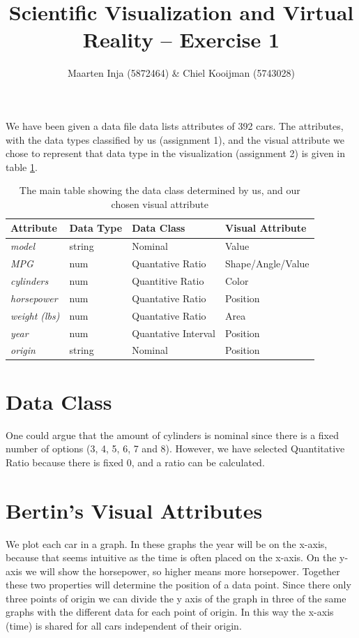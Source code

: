 \documentclass{article}[10pt]
\title{Scientific Visualization and Virtual Reality – Exercise 1}
\author{Maarten Inja (5872464) \& Chiel Kooijman (5743028)}
\begin{document}
\maketitle

We have been given a data file data lists attributes of 392 cars. The
attributes, with the data types classified by us (assignment 1), and the visual
attribute we chose to represent that data type in the visualization (assignment
2) is given in table \ref{tab:mainTable}.

\begin{table}
    \begin{tabular}{l l | l l}
    \textbf{Attribute} & \textbf{Data Type} & \textbf{Data Class} & \textbf{Visual Attribute}\\
    \hline
    \textit{model} & string & Nominal       &  Value \\
    \textit{MPG} & num & Quantative Ratio   & Shape/Angle/Value \\
    \textit{cylinders} & num & Quantitive Ratio & Color \\
    \textit{horsepower} & num & Quantative Ratio & Position\\
    \textit{weight (lbs)} & num & Quantative Ratio & Area \\
    \textit{year} & num & Quantative Interval & Position \\
    \textit{origin} & string & Nominal & Position
    \end{tabular}
\caption{The main table showing the data class determined by us, and our chosen
visual attribute}
\label{tab:mainTable}
\end{table}

\section{Data Class}
One could argue that the amount of cylinders is
nominal since there is a fixed number of options (3, 4, 5, 6, 7 and 8). However,
we have selected Quantitative Ratio because there is fixed 0, and a ratio can be
calculated.

\section{Bertin's Visual Attributes}

We plot each car in a graph.
In these graphs the year will be on the x-axis, because that seems intuitive as the time
is often placed on the x-axis. On the y-axis we will show the horsepower, so
higher means more horsepower.
Together these two properties will determine the position of a data point.
Since there only three points of origin we can divide the y axis of the graph
in three of the same graphs with the different data for each point of origin. In
this way the x-axis (time) is shared for all cars independent of their origin.
\end{document}
